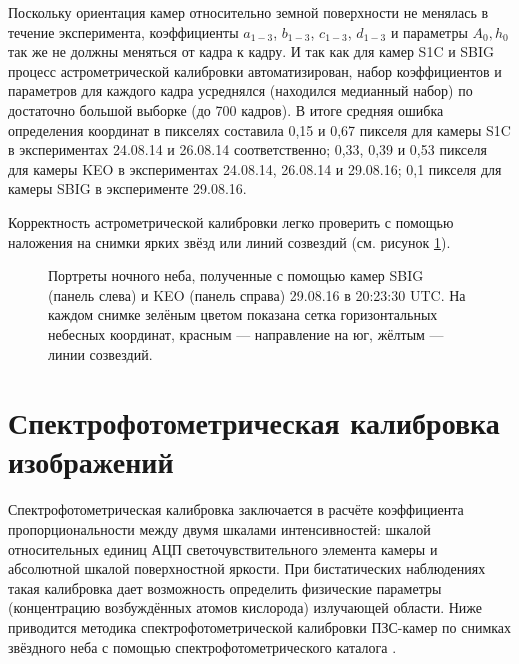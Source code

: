 \documentclass[12pt,a4paper]{article}
\begin{document}
Поскольку ориентация камер относительно земной поверхности не менялась в течение эксперимента, коэффициенты $a_{1-3}$, $b_{1-3}$, $c_{1-3}$, $d_{1-3}$ и параметры $A_0, h_0$ так же не должны меняться от кадра к кадру. И так как для камер S1C и SBIG процесс астрометрической калибровки автоматизирован, набор коэффициентов и параметров для каждого кадра усреднялся (находился медианный набор) по достаточно большой выборке (до 700 кадров). В итоге средняя ошибка определения координат в пикселях составила 0,15 и 0,67 пикселя для камеры S1C в экспериментах 24.08.14 и 26.08.14 соответственно; 0,33, 0,39 и 0,53 пикселя для камеры KEO в экспериментах 24.08.14, 26.08.14 и 29.08.16; 0,1 пикселя для камеры SBIG в эксперименте 29.08.16.

Корректность астрометрической калибровки легко проверить с помощью наложения на снимки ярких звёзд или линий созвездий (см. рисунок \ref{fig:fig2}).


\begin{figure}[h]
	\caption{Портреты ночного неба, полученные с помощью камер SBIG (панель слева) и KEO (панель справа) 29.08.16 в 20:23:30 UTC. На каждом снимке зелёным цветом показана сетка горизонтальных небесных координат, красным --- направление на юг, жёлтым --- линии созвездий.}
	\label{fig:fig2}
\end{figure}


\section{Спектрофотометрическая калибровка изображений} \label{sec:spectro_cal}
Спектрофотометрическая калибровка заключается в расчёте коэффициента пропорциональности между двумя шкалами интенсивностей: шкалой относительных единиц АЦП светочувствительного элемента камеры и абсолютной шкалой поверхностной яркости. При бистатических наблюдениях такая калибровка дает возможность определить физические параметры (концентрацию возбуждённых атомов кислорода) излучающей области. Ниже приводится методика спектрофотометрической калибровки ПЗС-камер по снимках звёздного неба с помощью спектрофотометрического каталога \cite{Kharitonov1978}.
\end{document}
